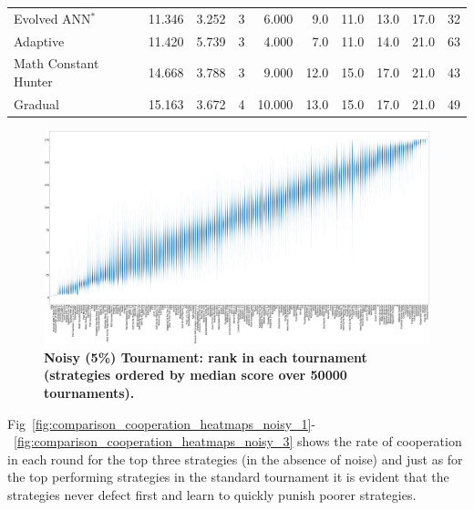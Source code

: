 \documentclass[10pt,letterpaper]{article}
\begin{document}
\begin{table}[!hbtp]
\begin{tabular}{lrrrrrrrrr}
Evolved ANN$^{*}$                &  11.346 &  3.252 &    3 &   6.000 &   9.0 &  11.0 &  13.0 &  17.0 &   32 \\
Adaptive                         &  11.420 &  5.739 &    3 &   4.000 &   7.0 &  11.0 &  14.0 &  21.0 &   63 \\
Math Constant Hunter             &  14.668 &  3.788 &    3 &   9.000 &  12.0 &  15.0 &  17.0 &  21.0 &   43 \\
Gradual                          &  15.163 &  3.672 &    4 &  10.000 &  13.0 &  15.0 &  17.0 &  21.0 &   49 \\
\bottomrule
\end{tabular}
        \label{tbl:noisy_ranks}
\end{table}

\begin{landscape}
    \begin{figure}[!hbtp]
        \centering
        \includegraphics[width=\paperwidth]{noisy_ranks_boxplots.eps}
        \caption{\bf Noisy (5\%) Tournament: rank in each tournament 
            (strategies ordered by median score over 50000 tournaments).}
        \label{fig:noisy_ranks_boxplot}
    \end{figure}
\end{landscape}

Fig~\ref{fig:comparison_cooperation_heatmaps_noisy_1}-~\ref{fig:comparison_cooperation_heatmaps_noisy_3} shows the rate of
cooperation in each round for the top three strategies (in the absence of noise)
and just as for the top performing strategies in the standard tournament
it is evident that
the strategies never defect first and learn to quickly punish poorer strategies.
\end{document}
